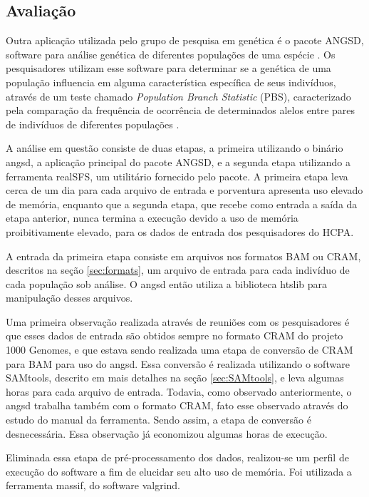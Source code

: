 \documentclass[cic,tc]{iiufrgs}
\begin{document}
{\subsection{Avaliação}

Outra aplicação utilizada pelo grupo de pesquisa em genética é o pacote ANGSD,
software para análise genética de diferentes populações de uma
espécie \cite{korneliussen2014angsd}. Os pesquisadores utilizam esse software
para determinar se a genética de uma população influencia em alguma
característica específica de seus indivíduos, através de um teste chamado
\textit{Population Branch Statistic} (PBS), caracterizado pela comparação da
frequência de ocorrência de determinados alelos entre pares de
indivíduos de diferentes populações \cite{yi2010sequencing}.

A análise em questão consiste de duas etapas, a primeira utilizando o binário
angsd, a aplicação principal do pacote ANGSD, e a segunda etapa utilizando a
ferramenta realSFS, um utilitário fornecido pelo pacote. A primeira etapa leva
cerca de um dia para cada arquivo de entrada e porventura apresenta uso elevado
de memória, enquanto que a segunda etapa, que recebe como entrada a saída da
etapa anterior, nunca termina a execução devido a uso de memória
proibitivamente elevado, para os dados de entrada dos pesquisadores do HCPA.

A entrada da primeira etapa consiste em arquivos nos formatos BAM ou CRAM,
descritos na seção \ref{sec:formats}, um arquivo de entrada para cada indivíduo
de cada população sob análise. O angsd então utiliza a biblioteca
htslib para manipulação desses arquivos.

Uma primeira observação realizada através de reuniões com os pesquisadores é
que esses dados de entrada são obtidos sempre no formato CRAM do projeto 1000
Genomes, e que estava sendo realizada uma etapa de conversão de CRAM para BAM
para uso do angsd. Essa conversão é realizada utilizando o software SAMtools,
descrito em mais detalhes na seção \ref{sec:SAMtools}, e leva algumas horas
para cada arquivo de entrada. Todavia, como observado anteriormente, o angsd
trabalha também com o formato CRAM, fato esse observado através do estudo do
manual da ferramenta. Sendo assim, a etapa de conversão é desnecessária. Essa
observação já economizou algumas horas de execução.

Eliminada essa etapa de pré-processamento dos dados, realizou-se um perfil de
execução do software a fim de elucidar seu alto uso de memória. Foi utilizada a
ferramenta massif, do software valgrind.

}
\end{document}
